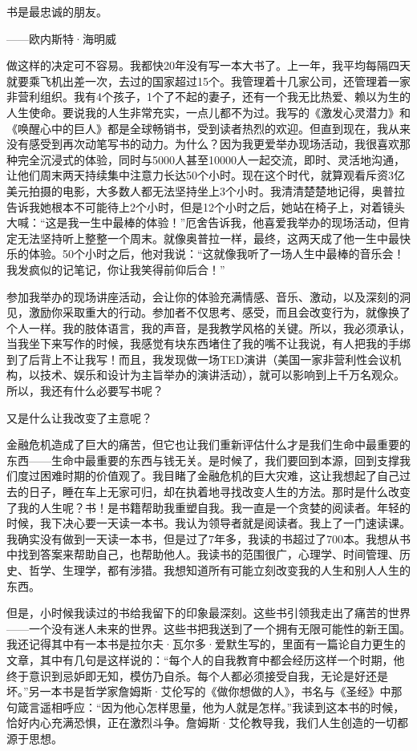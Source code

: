 \begin{BookQuote}
书是最忠诚的朋友。

\hfill ——欧内斯特·海明威
\end{BookQuote}

做这样的决定可不容易。我都快20年没有写一本大书了。上一年，我平均每隔四天就要乘飞机出差一次，去过的国家超过15个。我管理着十几家公司，还管理着一家非营利组织。我有4个孩子，1个了不起的妻子，还有一个我无比热爱、赖以为生的人生使命。要说我的人生非常充实，一点儿都不为过。我写的《激发心灵潜力》和《唤醒心中的巨人》都是全球畅销书，受到读者热烈的欢迎。但直到现在，我从来没有感受到再次动笔写书的动力。为什么？因为我更爱举办现场活动，我很喜欢那种完全沉浸式的体验，同时与5000人甚至10000人一起交流，即时、灵活地沟通，让他们周末两天持续集中注意力长达50个小时。现在这个时代，就算观看斥资3亿美元拍摄的电影，大多数人都无法坚持坐上3个小时。我清清楚楚地记得，奥普拉告诉我她根本不可能待上2个小时，但是12个小时之后，她站在椅子上，对着镜头大喊：“这是我一生中最棒的体验！”厄舍告诉我，他喜爱我举办的现场活动，但肯定无法坚持听上整整一个周末。就像奥普拉一样，最终，这两天成了他一生中最快乐的体验。50个小时之后，他对我说：“这就像我听了一场人生中最棒的音乐会！我发疯似的记笔记，你让我笑得前仰后合！”

参加我举办的现场讲座活动，会让你的体验充满情感、音乐、激动，以及深刻的洞见，激励你采取重大的行动。参加者不仅思考、感受，而且会改变行为，就像换了个人一样。我的肢体语言，我的声音，是我教学风格的关键。所以，我必须承认，当我坐下来写作的时候，我感觉有块东西堵住了我的嘴不让我说，有人把我的手绑到了后背上不让我写！而且，我发现做一场TED演讲（美国一家非营利性会议机构，以技术、娱乐和设计为主旨举办的演讲活动），就可以影响到上千万名观众。所以，我还有什么必要写书呢？

又是什么让我改变了主意呢？

金融危机造成了巨大的痛苦，但它也让我们重新评估什么才是我们生命中最重要的东西——生命中最重要的东西与钱无关。是时候了，我们要回到本源，回到支撑我们度过困难时期的价值观了。我目睹了金融危机的巨大灾难，这让我想起了自己过去的日子，睡在车上无家可归，却在执着地寻找改变人生的方法。那时是什么改变了我的人生呢？书！是书籍帮助我重塑自我。我一直是一个贪婪的阅读者。年轻的时候，我下决心要一天读一本书。我认为领导者就是阅读者。我上了一门速读课。我确实没有做到一天读一本书，但是过了7年多，我读的书超过了700本。我想从书中找到答案来帮助自己，也帮助他人。我读书的范围很广，心理学、时间管理、历史、哲学、生理学，都有涉猎。我想知道所有可能立刻改变我的人生和别人人生的东西。

但是，小时候我读过的书给我留下的印象最深刻。这些书引领我走出了痛苦的世界——一个没有迷人未来的世界。这些书把我送到了一个拥有无限可能性的新王国。我还记得其中有一本书是拉尔夫·瓦尔多·爱默生写的，里面有一篇论自力更生的文章，其中有几句是这样说的：“每个人的自我教育中都会经历这样一个时期，他终于意识到忌妒即无知，模仿乃自杀。每个人都必须接受自我，无论是好还是坏。”另一本书是哲学家詹姆斯·艾伦写的《做你想做的人》，书名与《圣经》中那句箴言遥相呼应：“因为他心怎样思量，他为人就是怎样。”我读到这本书的时候，恰好内心充满恐惧，正在激烈斗争。詹姆斯·艾伦教导我，我们人生创造的一切都源于思想。

